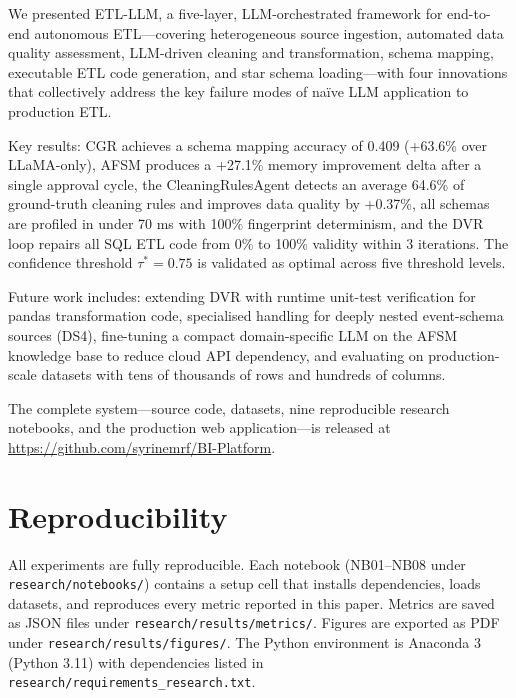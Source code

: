\documentclass[9pt,a4paper,twocolumn,twoside]{rho-class/rho}
\begin{document}
    We presented \textsc{ETL-LLM}, a five-layer, LLM-orchestrated framework for end-to-end autonomous ETL---covering heterogeneous source ingestion, automated data quality assessment, LLM-driven cleaning and transformation, schema mapping, executable ETL code generation, and star schema loading---with four innovations that collectively address the key failure modes of na\"ive LLM application to production ETL.

    Key results: CGR achieves a schema mapping accuracy of 0.409 (+63.6\% over LLaMA-only), AFSM produces a +27.1\% memory improvement delta after a single approval cycle, the CleaningRulesAgent detects an average 64.6\% of ground-truth cleaning rules and improves data quality by +0.37\%, all schemas are profiled in under 70 ms with 100\% fingerprint determinism, and the DVR loop repairs all SQL ETL code from 0\% to 100\% validity within 3 iterations. The confidence threshold $\tau^* = 0.75$ is validated as optimal across five threshold levels.

    Future work includes: extending DVR with runtime unit-test verification for pandas transformation code, specialised handling for deeply nested event-schema sources (DS4), fine-tuning a compact domain-specific LLM on the AFSM knowledge base to reduce cloud API dependency, and evaluating on production-scale datasets with tens of thousands of rows and hundreds of columns.

    The complete system—source code, datasets, nine reproducible research notebooks, and the production web application—is released at \url{https://github.com/syrinemrf/BI-Platform}.


\section*{Reproducibility}

    All experiments are fully reproducible. Each notebook (NB01--NB08 under \texttt{research/notebooks/}) contains a setup cell that installs dependencies, loads datasets, and reproduces every metric reported in this paper. Metrics are saved as JSON files under \texttt{research/results/metrics/}. Figures are exported as PDF under \texttt{research/results/figures/}. The Python environment is Anaconda 3 (Python 3.11) with dependencies listed in \texttt{research/requirements\_research.txt}.

\end{document}
